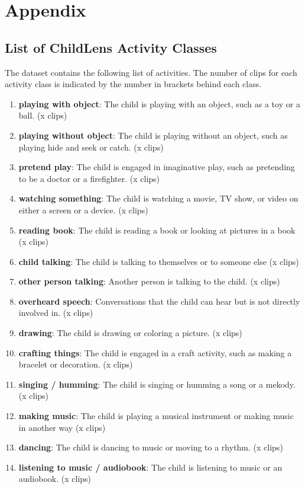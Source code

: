 \documentclass[
  man,floatsintext]{apa6}
\providecommand{\tightlist}{%
  \setlength{\itemsep}{0pt}\setlength{\parskip}{0pt}}
\begin{document}
\endgroup

\newpage

\section{Appendix}\label{appendix}

\subsection{List of ChildLens Activity Classes}\label{list-of-childlens-activity-classes}

The dataset contains the following list of activities. The number of clips for each activity class is indicated by the number in brackets behind each class.

\begin{enumerate}
\def\labelenumi{\arabic{enumi}.}
\tightlist
\item
  \textbf{playing with object}: The child is playing with an object, such as a toy or a ball. (x clips)
\item
  \textbf{playing without object}: The child is playing without an object, such as playing hide and seek or catch. (x clips)
\item
  \textbf{pretend play}: The child is engaged in imaginative play, such as pretending to be a doctor or a firefighter. (x clips)
\item
  \textbf{watching something}: The child is watching a movie, TV show, or video on either a screen or a device. (x clips)
\item
  \textbf{reading book}: The child is reading a book or looking at pictures in a book (x clips)
\item
  \textbf{child talking}: The child is talking to themselves or to someone else (x clips)
\item
  \textbf{other person talking}: Another person is talking to the child. (x clips)
\item
  \textbf{overheard speech}: Conversations that the child can hear but is not directly involved in. (x clips)
\item
  \textbf{drawing}: The child is drawing or coloring a picture. (x clips)
\item
  \textbf{crafting things}: The child is engaged in a craft activity, such as making a bracelet or decoration. (x clips)
\item
  \textbf{singing / humming}: The child is singing or humming a song or a mekody. (x clips)
\item
  \textbf{making music}: The child is playing a musical instrument or making music in another way (x clips)
\item
  \textbf{dancing}: The child is dancing to music or moving to a rhythm. (x clips)
\item
  \textbf{listening to music / audiobook}: The child is listening to music or an audiobook. (x clips)
\end{enumerate}
\end{document}
